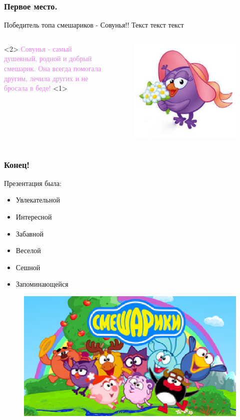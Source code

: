 \documentclass[roman, 12pt]{beamer}
\begin{document}
	\begin{frame}
		\frametitle{Первое место.}
		
		\begin{block}{Победитель топа смешариков - Совунья!!}
			Текст текст текст
		\end{block}
		
		\begin{columns}
			<2>
				\textcolor{violet}{Совунья - самый душевный, родной и добрый смешарик. Она всегда помогала другим, лечила других и не бросала в беде!}
			<1>
				\begin{figure}
					\includegraphics[width=0.7\linewidth]{images/sovunia}
				\end{figure}
			\end{columns}
	
		\end{frame}
	
	\begin{frame}
		\frametitle{Конец!}
		Презентация была:
		\begin{itemize}
			\item<1-6> Увлекательной
			\item<2-6> Интересной
			\item<3-6> Забавной
			\item<4-6> Веселой
			\item<5-6> Сешной
			\item<6> Запоминающейся
		\end{itemize}
		\begin{figure} 
			\includegraphics[width=0.7\linewidth]{images/kokoriki}
		\end{figure}
		
		\end {frame}
	
\end{document}
